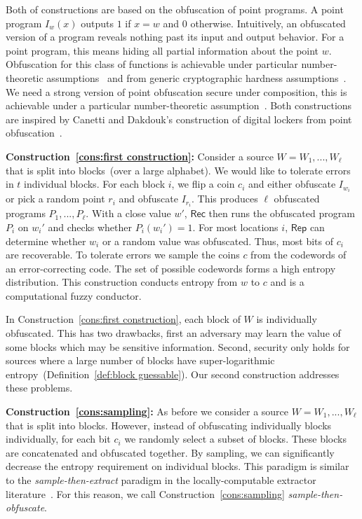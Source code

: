 \documentclass[11pt]{article}
\newcommand{\defref}[1]{\mbox{Definition~\ref{#1}}}
\newcommand{\consref}[1]{\mbox{Construction~\ref{#1}}}
\newcommand{\class}[1]{{\ensuremath{\mathsf{#1}}}}
\newcommand{\rep}{\ensuremath{\class{Rep}}\xspace}
\newcommand{\rec}{\ensuremath{\class{Rec}}\xspace}
\begin{document}
Both of constructions are based on the obfuscation of point programs.  A point program $I_w(x)$ outputs $1$ if $x=w$ and $0$ otherwise.  Intuitively, an obfuscated version of a program reveals nothing past its input and output behavior.  For a point program, this means hiding all partial information about the point $w$.  Obfuscation for this class of functions is achievable under particular number-theoretic assumptions~\cite{canetti1997towards} and from generic cryptographic hardness assumptions~\cite{wee2005obfuscating}.  We need a strong version of point obfuscation secure under composition, this is achievable under a particular number-theoretic assumption~\cite{bitansky2010strong}.  Both constructions are inspired by Canetti and Dakdouk's construction of digital lockers from point obfuscation~\cite{canetti2008obfuscating}.  



\textbf{\consref{cons:first construction}: }
Consider a source $W = W_1,..., W_\ell$ that is split into blocks~(over a large alphabet).  We would like to tolerate errors in $t$ individual blocks.  For each block $i$, we flip a coin $c_i$ and either obfuscate $I_{w_i}$ or pick a random point $r_i$ and obfuscate $I_{r_i}$.  This produces $\ell$ obfuscated programs $P_1,..., P_\ell$.  With a close value $w'$, $\rec$ then runs the obfuscated program $P_i$ on $w_i'$ and checks whether $P_i(w_i')=1$.  For most locations $i$, \rep can determine whether $w_i$ or a random value was obfuscated.  Thus, most bits of $c_i$ are recoverable. To tolerate errors we sample the coins $c$ from the codewords of an error-correcting code.  The set of possible codewords forms a high entropy distribution.  This construction conducts entropy from $w$ to $c$ and is a computational fuzzy conductor.

In \consref{cons:first construction}, each block of $W$ is individually obfuscated.  This has two drawbacks, first an adversary may learn the value of some blocks which may be sensitive information.  Second, security only holds for sources where a large number of blocks have super-logarithmic entropy~(\defref{def:block guessable}).  Our second construction addresses these problems.

\textbf{\consref{cons:sampling}: }
As before we consider a source $W=W_1,...,W_\ell$ that is split into blocks.  However, instead of obfuscating individually
blocks individually, for each bit $c_i$ we randomly select a subset of blocks.  These blocks are concatenated and obfuscated together.  By sampling, we can significantly decrease the entropy requirement on individual blocks.  This paradigm is similar to the \emph{sample-then-extract} paradigm in the locally-computable extractor literature~\cite{lu2002hyper,vadhan2003constructing}.  For this reason, we call \consref{cons:sampling} \emph{sample-then-obfuscate}.
\end{document}
